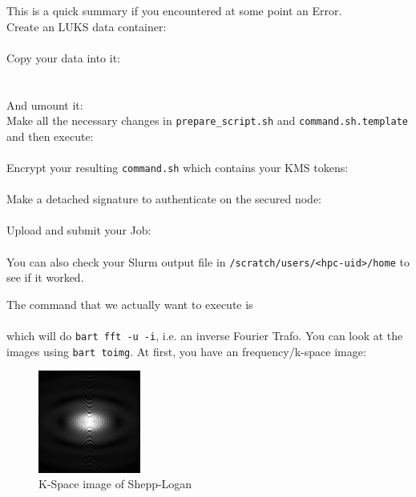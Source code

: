 \documentclass[paper=a4]{scrartcl}
\begin{document}
This is a quick summary if you encountered at some point an Error.\\
Create an LUKS data container:\\
 \\
Copy your data into it:\\
 \\
\\
And umount it:
\\
Make all the necessary changes in \texttt{prepare\_script.sh} and \texttt{command.sh.template} and then execute:\\
\\
Encrypt your resulting \texttt{command.sh} which contains your KMS tokens:\\
 \\
Make a detached signature to authenticate on the secured node: \\
 \\
Upload and submit your Job:
\\
\\
You can also check your Slurm output file in \texttt{/scratch/users/<hpc-uid>/home} to see if it worked.

The command that we actually want to execute is \\
 \\
which will do \texttt{bart fft -u -i}, i.e. an inverse Fourier Trafo.
You can look at the images using \texttt{bart toimg}.
At first, you have an frequency/k-space image:

\begin{figure}[!ht]
    \centerline{\includegraphics[width=0.3\textwidth]{kraum.png}}
    \caption{K-Space image of Shepp-Logan}
    \label{fig:secure_sbatch}
\end{figure}
\end{document}
